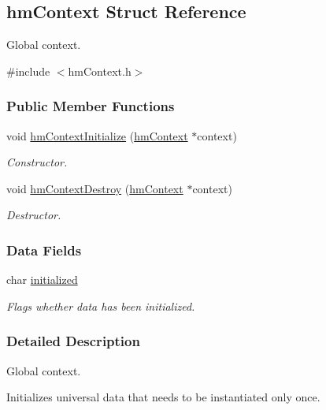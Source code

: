 \hypertarget{structhm_context}{\subsection{hm\-Context Struct Reference}
\label{structhm_context}
}


Global context.  




{\ttfamily \#include $<$hm\-Context.\-h$>$}

\subsubsection*{Public Member Functions}
\begin{DoxyCompactItemize}
\item 
void \hyperlink{structhm_context_a081544c9c15a784afef4c4f33dd7f87c}{hm\-Context\-Initialize} (\hyperlink{structhm_context}{hm\-Context} $\ast$context)
\begin{DoxyCompactList}\small\item\em Constructor. \end{DoxyCompactList}\item 
void \hyperlink{structhm_context_a8289b2e8661da3d42d5818189157314c}{hm\-Context\-Destroy} (\hyperlink{structhm_context}{hm\-Context} $\ast$context)
\begin{DoxyCompactList}\small\item\em Destructor. \end{DoxyCompactList}\end{DoxyCompactItemize}
\subsubsection*{Data Fields}
\begin{DoxyCompactItemize}
\item 
char \hyperlink{structhm_context_ab8b6ac4b4d5153831d186c3a8753dadb}{initialized}
\begin{DoxyCompactList}\small\item\em Flags whether data has been initialized. \end{DoxyCompactList}\end{DoxyCompactItemize}


\subsubsection{Detailed Description}
Global context. 

Initializes universal data that needs to be instantiated only once. 

